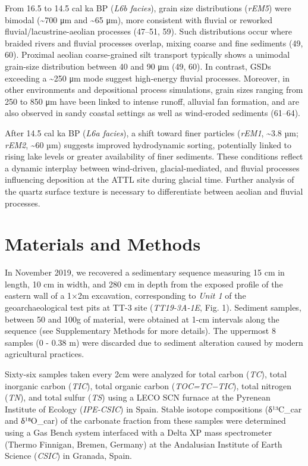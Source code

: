 \documentclass[
]{article}
\begin{document}
From 16.5 to 14.5 cal ka BP (\emph{L6b facies}), grain size
distributions (\emph{rEM5}) were bimodal (\textasciitilde700 μm and
\textasciitilde65 μm), more consistent with fluvial or reworked
fluvial/lacustrine-aeolian processes (47--51, 59). Such distributions
occur where braided rivers and fluvial processes overlap, mixing coarse
and fine sediments (49, 60). Proximal aeolian coarse-grained silt
transport typically shows a unimodal grain-size distribution between 40
and 90 μm (49, 60). In contrast, GSDs exceeding a \textasciitilde250 μm
mode suggest high-energy fluvial processes. Moreover, in other
environments and depositional process simulations, grain sizes ranging
from 250 to 850 μm have been linked to intense runoff, alluvial fan
formation, and are also observed in sandy coastal settings as well as
wind-eroded sediments (61--64).

After 14.5 cal ka BP (\emph{L6a facies}), a shift toward finer particles
(\emph{rEM1}, \textasciitilde3.8 µm; \emph{rEM2}, \textasciitilde60 µm)
suggests improved hydrodynamic sorting, potentially linked to rising
lake levels or greater availability of finer sediments. These conditions
reflect a dynamic interplay between wind-driven, glacial-mediated, and
fluvial processes influencing deposition at the ATTL site during glacial
time. Further analysis of the quartz surface texture is necessary to
differentiate between aeolian and fluvial processes.

\section{Materials and Methods}\label{materials-and-methods}

In November 2019, we recovered a sedimentary sequence measuring 15 cm in
length, 10 cm in width, and 280 cm in depth from the exposed profile of
the eastern wall of a 1×2m excavation, corresponding to \emph{Unit 1} of
the geoarchaeological test pits at TT-3 site (\emph{TT19-3A-1E}, Fig.
1). Sediment samples, between 50 and 100g of material, were obtained at
1-cm intervals along the sequence (see Supplementary Methods for more
details). The uppermost 8 samples (0 - 0.38 m) were discarded due to
sediment alteration caused by modern agricultural practices.

Sixty-six samples taken every 2cm were analyzed for total carbon
(\emph{TC}), total inorganic carbon (\emph{TIC}), total organic carbon
(\emph{TOC=TC−TIC}), total nitrogen (\emph{TN}), and total sulfur
(\emph{TS}) using a LECO SCN furnace at the Pyrenean Institute of
Ecology (\emph{IPE-CSIC}) in Spain. Stable isotope compositions
(δ¹³C\_car and δ¹⁸O\_car) of the carbonate fraction from these samples
were determined using a Gas Bench system interfaced with a Delta XP mass
spectrometer (Thermo Finnigan, Bremen, Germany) at the Andalusian
Institute of Earth Science (\emph{CSIC}) in Granada, Spain.
\end{document}
